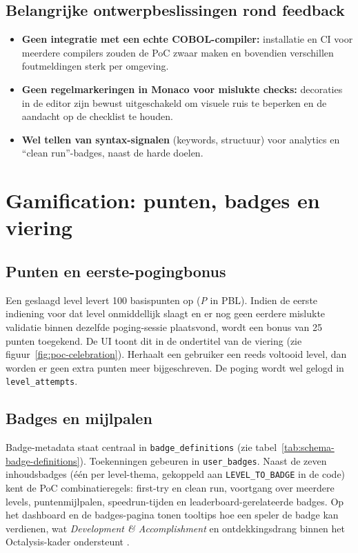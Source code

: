 \subsection{Belangrijke ontwerpbeslissingen rond feedback}
\begin{itemize}
    \item \textbf{Geen integratie met een echte COBOL-compiler:} installatie en CI voor meerdere compilers zouden de PoC zwaar maken en bovendien verschillen foutmeldingen sterk per omgeving.
    \item \textbf{Geen regelmarkeringen in Monaco voor mislukte checks:} decoraties in de editor zijn bewust uitgeschakeld om visuele ruis te beperken en de aandacht op de checklist te houden.
    \item \textbf{Wel tellen van syntax-signalen} (keywords, structuur) voor analytics en ``clean run''-badges, naast de harde doelen.
\end{itemize}


\section{Gamification: punten, badges en viering}

\subsection{Punten en eerste-pogingbonus}
Een geslaagd level levert 100 basispunten op (\textit{P} in PBL).
Indien de eerste indiening voor dat level onmiddellijk slaagt en er nog geen eerdere mislukte validatie binnen dezelfde poging-sessie plaatsvond, wordt een bonus van 25 punten toegekend.
De UI toont dit in de ondertitel van de viering (zie figuur~\ref{fig:poc-celebration}).
Herhaalt een gebruiker een reeds voltooid level, dan worden er geen extra punten meer bijgeschreven. De poging wordt wel gelogd in \texttt{level\_attempts}.

\subsection{Badges en mijlpalen}
Badge-metadata staat centraal in \texttt{badge\_definitions} (zie tabel~\ref{tab:schema-badge-definitions}). Toekenningen gebeuren in \texttt{user\_badges}.
Naast de zeven inhoudsbadges (één per level-thema, gekoppeld aan \texttt{LEVEL\_TO\_BADGE} in de code) kent de PoC combinatieregels: first-try en clean run, voortgang over meerdere levels, puntenmijlpalen, speedrun-tijden en leaderboard-gerelateerde badges.
Op het dashboard en de badges-pagina tonen tooltips hoe een speler de badge kan verdienen, wat \textit{Development \& Accomplishment} en ontdekkingsdrang binnen het Octalysis-kader ondersteunt \autocite{Chou2015}.

